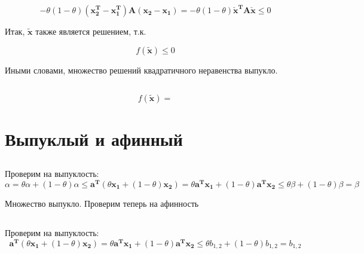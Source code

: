 	\begin{equation}
	-\theta(1-\theta) (\mathbf{x_2^T} - \mathbf{x_1^T})\mathbf{A} (\mathbf{x_2} - \mathbf{x_1}) =- \theta(1-\theta) \mathbf{\check{x}^T}\mathbf{A}\mathbf{\check{x}} \leqslant 0
	\end{equation}
	
	Итак, $\mathbf{\tilde{x}}$ также является решением, т.к.
	
	\begin{equation}
	f(\mathbf{\tilde{x}}) \leqslant 0
	\end{equation}
	
	Иными словами, множество решений квадратичного неравенства выпукло.
	

	
	
	\subsection{}
	
	\begin{equation}
	f(\mathbf{\tilde{x}}) = 
	\end{equation}
	
	\section{Выпуклый и афинный}
	
	\subsection{}
	
	Проверим на выпуклость:
	\begin{equation}
	\alpha = \theta \alpha + (1 - \theta) \alpha \leqslant \mathbf{a^T} (\theta \mathbf{x_1} + (1 - \theta) \mathbf{x_2}) = \theta \mathbf{a^T} \mathbf{x_1} + (1 - \theta) \mathbf{a^T} \mathbf{x_2} \leqslant  \theta \beta + (1 - \theta) \beta = \beta 
	\end{equation}
	
	Множество выпукло. Проверим теперь на афинность
	
	\subsection{}
	
	Проверим на выпуклость:
	\begin{equation}
	\mathbf{a^T} (\theta \mathbf{x_1} + (1 - \theta) \mathbf{x_2}) = \theta \mathbf{a^T} \mathbf{x_1} + (1 - \theta) \mathbf{a^T} \mathbf{x_2} \leqslant  \theta b_{1,2} + (1 - \theta) b_{1,2} = b_{1,2}
	\end{equation}
	
